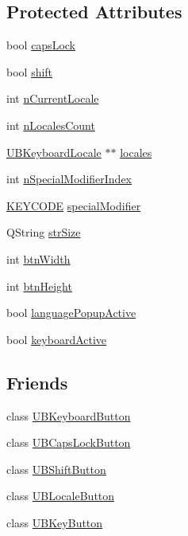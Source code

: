 \subsection*{Protected Attributes}
\begin{DoxyCompactItemize}
\item 
bool \hyperlink{class_u_b_keyboard_palette_a8cce464c5b9974a0b7f83975310fc4af}{caps\-Lock}
\item 
bool \hyperlink{class_u_b_keyboard_palette_ad95b375ea44ad34e3ea756372a4edbf5}{shift}
\item 
int \hyperlink{class_u_b_keyboard_palette_a5cc143fd2f778206618afad6f0dcb2b6}{n\-Current\-Locale}
\item 
int \hyperlink{class_u_b_keyboard_palette_a8607ac73d82334965befc3e8580fcb4b}{n\-Locales\-Count}
\item 
\hyperlink{class_u_b_keyboard_locale}{U\-B\-Keyboard\-Locale} $\ast$$\ast$ \hyperlink{class_u_b_keyboard_palette_a21f5effb3b82fc431de3e5f7f35d612d}{locales}
\item 
int \hyperlink{class_u_b_keyboard_palette_ae4cd6698472f172cffa56aa9104f4bdc}{n\-Special\-Modifier\-Index}
\item 
\hyperlink{struct_k_e_y_c_o_d_e}{K\-E\-Y\-C\-O\-D\-E} \hyperlink{class_u_b_keyboard_palette_ab5ba725c0853d7e402e94195368e7ef3}{special\-Modifier}
\item 
Q\-String \hyperlink{class_u_b_keyboard_palette_a74a528e1583463f1c68553ae1b4d4ccc}{str\-Size}
\item 
int \hyperlink{class_u_b_keyboard_palette_a2703020b8e54ecb7dbd47b5a59e70389}{btn\-Width}
\item 
int \hyperlink{class_u_b_keyboard_palette_a8962dc6970979b1e417b39ba7ad05975}{btn\-Height}
\item 
bool \hyperlink{class_u_b_keyboard_palette_a81336a2103daeb7dc6cdfccbd16d3c28}{language\-Popup\-Active}
\item 
bool \hyperlink{class_u_b_keyboard_palette_aef54c43da0af803602863f013f643aaa}{keyboard\-Active}
\end{DoxyCompactItemize}
\subsection*{Friends}
\begin{DoxyCompactItemize}
\item 
class \hyperlink{class_u_b_keyboard_palette_a2fee37f0ee7ccf18ed88d1b5b948df46}{U\-B\-Keyboard\-Button}
\item 
class \hyperlink{class_u_b_keyboard_palette_a581dfcd5d1c8859bf8b05143bcc82245}{U\-B\-Caps\-Lock\-Button}
\item 
class \hyperlink{class_u_b_keyboard_palette_a1b5e1692d61dd3978962a4590ba37a49}{U\-B\-Shift\-Button}
\item 
class \hyperlink{class_u_b_keyboard_palette_ad529f92a5b8f216b0a349c6ef547780f}{U\-B\-Locale\-Button}
\item 
class \hyperlink{class_u_b_keyboard_palette_af8def2211b5ddbef04883b9e2b3f00d1}{U\-B\-Key\-Button}
\end{DoxyCompactItemize}
